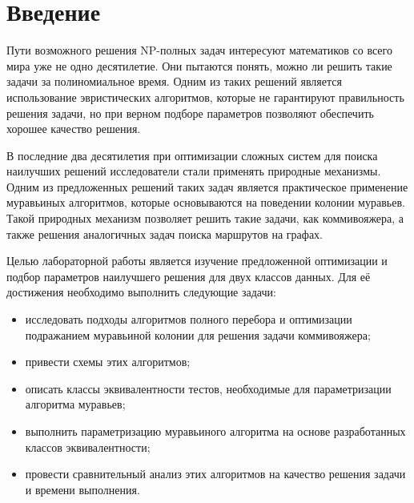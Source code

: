 \chapter*{Введение}
Пути возможного решения NP-полных задач интересуют математиков со всего мира уже не одно десятилетие. Они пытаются понять, можно ли решить такие задачи за полиномиальное время. Одним из таких решений является использование эвристических алгоритмов, которые не гарантируют правильность решения задачи, но при верном подборе параметров позволяют обеспечить хорошее качество решения.

В последние два десятилетия при оптимизации сложных систем для поиска наилучших решений исследователи стали применять природные механизмы. Одним из предложенных решений таких задач является практическое применение муравьиных алгоритмов, которые основываются на поведении колонии муравьев\cite{ant_1}. Такой природных механизм позволяет решить такие задачи, как 
 коммивояжера\grqq, а также решения аналогичных задач поиска маршрутов на графах.  

Целью лабораторной работы является изучение предложенной оптимизации и подбор параметров наилучшего решения для двух классов данных. Для её достижения необходимо выполнить следующие задачи:
\begin{itemize}
	\item исследовать подходы алгоритмов полного перебора и оптимизации подражанием муравьиной колонии для решения задачи коммивояжера;
	\item привести схемы этих алгоритмов;
	\item описать классы эквивалентности тестов, необходимые для параметризации алгоритма муравьев;
	\item выполнить параметризацию муравьиного алгоритма на основе разработанных классов эквивалентности;
	\item провести сравнительный анализ этих алгоритмов на качество решения задачи и времени выполнения.
\end{itemize}